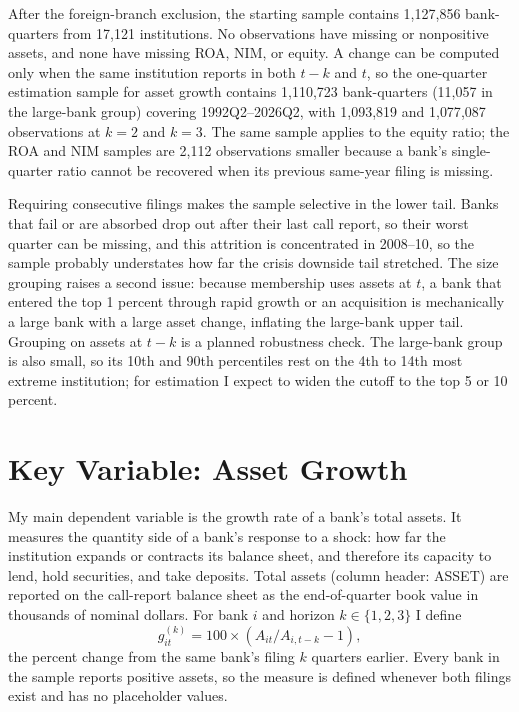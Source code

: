 \documentclass[11pt]{article}
\begin{document}
After the foreign-branch exclusion, the starting sample contains 1{,}127{,}856 bank-quarters from 17{,}121 institutions. No observations have missing or nonpositive assets, and none have missing ROA, NIM, or equity. A change can be computed only when the same institution reports in both $t-k$ and $t$, so the one-quarter estimation sample for asset growth contains 1{,}110{,}723 bank-quarters (11{,}057 in the large-bank group) covering 1992Q2--2026Q2, with 1{,}093{,}819 and 1{,}077{,}087 observations at $k=2$ and $k=3$. The same sample applies to the equity ratio; the ROA and NIM samples are 2{,}112 observations smaller because a bank's single-quarter ratio cannot be recovered when its previous same-year filing is missing.

Requiring consecutive filings makes the sample selective in the lower tail. Banks that fail or are absorbed drop out after their last call report, so their worst quarter can be missing, and this attrition is concentrated in 2008--10, so the sample probably understates how far the crisis downside tail stretched. The size grouping raises a second issue: because membership uses assets at $t$, a bank that entered the top 1 percent through rapid growth or an acquisition is mechanically a large bank with a large asset change, inflating the large-bank upper tail. Grouping on assets at $t-k$ is a planned robustness check. The large-bank group is also small, so its 10th and 90th percentiles rest on the 4th to 14th most extreme institution; for estimation I expect to widen the cutoff to the top 5 or 10 percent.

\section*{Key Variable: Asset Growth}

My main dependent variable is the growth rate of a bank's total assets. It measures the quantity side of a bank's response to a shock: how far the institution expands or contracts its balance sheet, and therefore its capacity to lend, hold securities, and take deposits. Total assets (column header: ASSET) are reported on the call-report balance sheet as the end-of-quarter book value in thousands of nominal dollars. For bank $i$ and horizon $k\in\{1,2,3\}$ I define
\[
  g^{(k)}_{it} = 100 \times \left( A_{it} / A_{i,t-k} - 1 \right),
\]
the percent change from the same bank's filing $k$ quarters earlier. Every bank in the sample reports positive assets, so the measure is defined whenever both filings exist and has no placeholder values.
\end{document}
